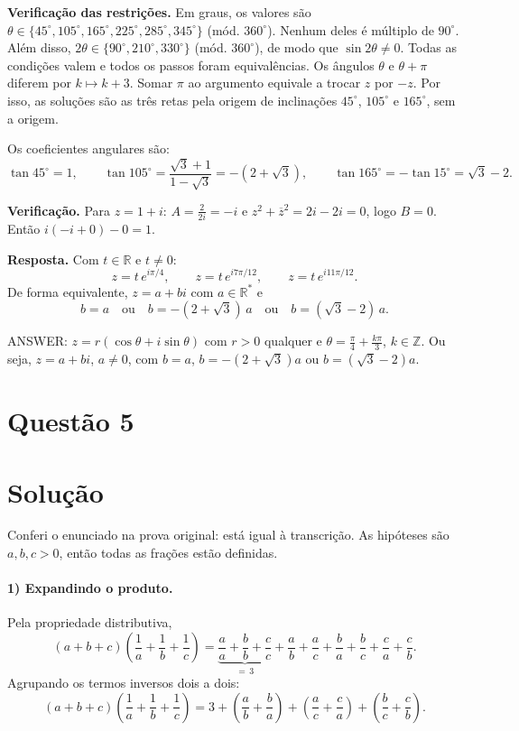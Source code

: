 \documentclass{article}%
\begin{document}
\textbf{Verificação das restrições.} Em graus, os valores são $\theta\in\{45^\circ,105^\circ,165^\circ,225^\circ,285^\circ,345^\circ\}$ (mód. $360^\circ$). Nenhum deles é múltiplo de $90^\circ$. Além disso, $2\theta\in\{90^\circ,210^\circ,330^\circ\}$ (mód. $360^\circ$), de modo que $\sin2\theta\neq0$. Todas as condições valem e todos os passos foram equivalências. Os ângulos $\theta$ e $\theta+\pi$ diferem por $k\mapsto k+3$. Somar $\pi$ ao argumento equivale a trocar $z$ por $-z$. Por isso, as soluções são as três retas pela origem de inclinações $45^\circ$, $105^\circ$ e $165^\circ$, sem a origem.

Os coeficientes angulares são:
\[
\tan45^\circ=1,\qquad \tan105^\circ=\frac{\sqrt3+1}{1-\sqrt3}=-(2+\sqrt3),\qquad \tan165^\circ=-\tan15^\circ=\sqrt3-2 .
\]

\textbf{Verificação.} Para $z=1+i$: $A=\frac{2}{2i}=-i$ e $z^2+\overline{z}^2=2i-2i=0$, logo $B=0$. Então $i(-i+0)-0=1$. \checkmark

\textbf{Resposta.} Com $t\in\mathbb{R}$ e $t\neq 0$:
\[
z=t\,e^{i\pi/4},\qquad z=t\,e^{i7\pi/12},\qquad z=t\,e^{i11\pi/12}.
\]
De forma equivalente, $z=a+bi$ com $a\in\mathbb{R}^*$ e
\[
b=a\quad\text{ou}\quad b=-(2+\sqrt3)\,a\quad\text{ou}\quad b=(\sqrt3-2)\,a .
\]

ANSWER: $z=r(\cos\theta+i\sin\theta)$ com $r>0$ qualquer e $\theta=\frac{\pi}{4}+\frac{k\pi}{3}$, $k\in\mathbb{Z}$. Ou seja, $z=a+bi$, $a\neq0$, com $b=a$, $b=-(2+\sqrt3)a$ ou $b=(\sqrt3-2)a$.%
\newpage%
\section*{Questão 5}

\section*{Solução}

Conferi o enunciado na prova original: está igual à transcrição. As hipóteses são $a,b,c>0$, então todas as frações estão definidas.

\paragraph{1) Expandindo o produto.} Pela propriedade distributiva,
\[
(a+b+c)\left(\frac1a+\frac1b+\frac1c\right)
=\underbrace{\frac aa+\frac bb+\frac cc}_{=\,3}
+\frac ab+\frac ac+\frac ba+\frac bc+\frac ca+\frac cb .
\]
Agrupando os termos inversos dois a dois:
\[
(a+b+c)\left(\frac1a+\frac1b+\frac1c\right)
=3+\left(\frac ab+\frac ba\right)+\left(\frac ac+\frac ca\right)+\left(\frac bc+\frac cb\right). \tag{1}
\]
\end{document}
